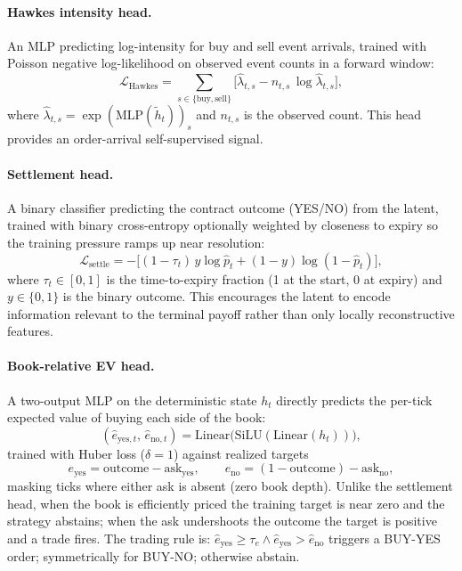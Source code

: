 \documentclass{article}
\newcommand{\hstate}{h_t}
\begin{document}
\paragraph{Hawkes intensity head.}
An MLP predicting log-intensity for buy and sell event arrivals, trained
with Poisson negative log-likelihood on observed event counts in a
forward window:
\begin{equation}
  \mathcal{L}_{\text{Hawkes}} = \sum_{s \in \{\text{buy},\text{sell}\}}
  \bigl[\hat{\lambda}_{t,s} - n_{t,s}\,\log\hat{\lambda}_{t,s}\bigr],
\end{equation}
where $\hat{\lambda}_{t,s} = \exp(\text{MLP}(\tilde{h}_t))_s$ and
$n_{t,s}$ is the observed count.  This head provides an order-arrival
self-supervised signal.

\paragraph{Settlement head.}
A binary classifier predicting the contract outcome (YES/NO) from the
latent, trained with binary cross-entropy optionally weighted by
closeness to expiry so the training pressure ramps up near resolution:
\begin{equation}
  \mathcal{L}_{\text{settle}} = -\bigl[(1 - \tau_t)\,
  y\log\hat{p}_t + (1 - y)\log(1 - \hat{p}_t)\bigr],
\end{equation}
where $\tau_t \in [0, 1]$ is the time-to-expiry fraction (1 at the
start, 0 at expiry) and $y \in \{0, 1\}$ is the binary outcome.  This
encourages the latent to encode information relevant to the terminal
payoff rather than only locally reconstructive features.

\paragraph{Book-relative EV head.}
A two-output MLP on the deterministic state $\hstate$ directly predicts
the per-tick expected value of buying each side of the book:
\[
  (\hat{e}_{\text{yes},t},\, \hat{e}_{\text{no},t})
  = \text{Linear}\!\bigl(\text{SiLU}(\text{Linear}(\hstate))\bigr),
\]
trained with Huber loss ($\delta=1$) against realized targets
\[
  e_{\text{yes}} = \text{outcome} - \text{ask}_{\text{yes}}, \qquad
  e_{\text{no}} = (1-\text{outcome}) - \text{ask}_{\text{no}},
\]
masking ticks where either ask is absent (zero book depth).  Unlike the
settlement head, when the book is efficiently priced the training target
is near zero and the strategy abstains; when the ask undershoots the
outcome the target is positive and a trade fires.  The trading rule is:
$\hat{e}_{\text{yes}} \geq \tau_e \wedge \hat{e}_{\text{yes}} >
\hat{e}_{\text{no}}$ triggers a BUY-YES order; symmetrically for
BUY-NO; otherwise abstain.
\end{document}
